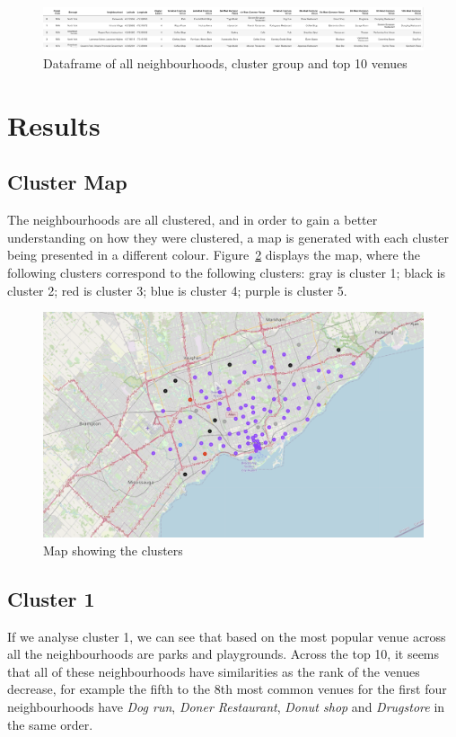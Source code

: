 \documentclass[12pt, conference]{IEEEtran}
\begin{document}
\begin{figure}[!h]
\center
\includegraphics[scale=0.37]{ClusterTable}
\caption{Dataframe of all neighbourhoods, cluster group and top 10 venues}
\label{fig: ClusterTable}
\end{figure}

\section{\textbf{Results}}
\label{sec: Reuslts}

\subsection{Cluster Map}
The neighbourhoods are all clustered, and in order to gain a better understanding on how they were clustered, a map is generated with each cluster being presented in a different colour. Figure~\ref{fig: ClusterMap} displays the map, where the following clusters correspond to the following clusters: gray is cluster 1; black is cluster 2; red is cluster 3; blue is cluster 4; purple is cluster 5.

\begin{figure}[!h]
\center
\includegraphics[scale=0.4]{ClusterMap}
\caption{Map showing the clusters}
\label{fig: ClusterMap}
\end{figure}

\subsection{Cluster 1}
If we analyse cluster 1, we can see that based on the most popular venue across all the neighbourhoods are parks and playgrounds. Across the top 10, it seems that all of these neighbourhoods have similarities as the rank of the venues decrease, for example the fifth to the 8th most common venues for the first four neighbourhoods have \textit{Dog run}, \textit{Doner Restaurant}, \textit{Donut shop} and \textit{Drugstore} in the same order.
\end{document}
